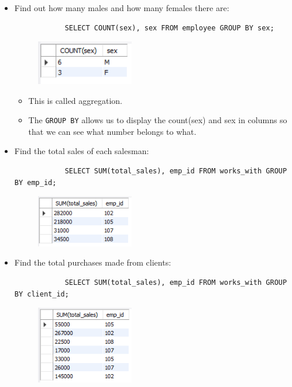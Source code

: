 \begin{itemize}
    \item Find out how many males and how many females there are:
        \begin{verbatim}
            SELECT COUNT(sex), sex FROM employee GROUP BY sex;
        \end{verbatim}
        \begin{figure}[H]
            \centering
            \includegraphics[width=0.4\textwidth]{./Figs/2020-12-24-20-58-58.png}
        \end{figure}
        \begin{itemize}
            \item This is called aggregation.
            \item The \texttt{GROUP BY} allows us to display the count(sex) and sex in columns so that we can see what number belongs to what.
        \end{itemize}
    
    \item Find the total sales of each salesman:
        \begin{verbatim}
            SELECT SUM(total_sales), emp_id FROM works_with GROUP BY emp_id;
        \end{verbatim}
        \begin{figure}[H]
            \centering
            \includegraphics[width=0.4\textwidth]{./Figs/2020-12-24-20-59-32.png}
        \end{figure}
    
    \item Find the total purchases made from clients:
        \begin{verbatim}
            SELECT SUM(total_sales), emp_id FROM works_with GROUP BY client_id;
        \end{verbatim}
        \begin{figure}[H]
            \centering
            \includegraphics[width=0.4\textwidth]{./Figs/2020-12-24-20-59-59.png}
        \end{figure}
\end{itemize}
